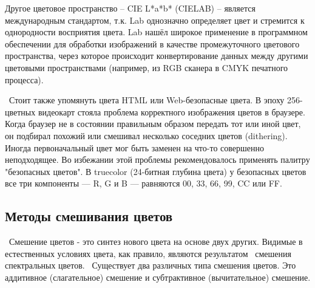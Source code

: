 \begin{figure}[ht!]
\end{figure}

Другое цветовое пространство -- CIE L*a*b* (CIELAB) -- является международным стандартом, т.к. Lab однозначно определяет цвет и стремится к однородности восприятия цвета. Lab нашёл широкое применение в программном обеспечении для обработки изображений в качестве промежуточного цветового пространства, через которое происходит конвертирование данных между другими цветовыми пространствами (например, из RGB сканера в CMYK печатного процесса). 

 Стоит также упомянуть цвета HTML или Web-безопасные цвета. В эпоху 256-цветных видеокарт стояла проблема корректного изображения цветов в браузере. Когда браузер не в состоянии правильным образом передать тот или иной цвет, он подбирал похожий или смешивал несколько соседних цветов (dithering). Иногда первоначальный цвет мог быть заменен на что-то совершенно неподходящее. Во избежании этой проблемы рекомендовалось применять палитру "безопасных цветов". В truecolor (24-битная глубина цвета)  у безопасных цветов все три компоненты — R, G и B — равняются 00, 33, 66, 99, CC или FF. 
 
\subsection{Методы смешивания цветов}
 Смешение цветов - это синтез нового цвета на основе двух других.  Видимые в естественных условиях цвета, как правило, являются результатом
 смешения спектральных цветов.
 Существует два различных типа смешения цветов. Это аддитивное (слагательное) смешение и субтрактивное (вычитательное) смешение.
